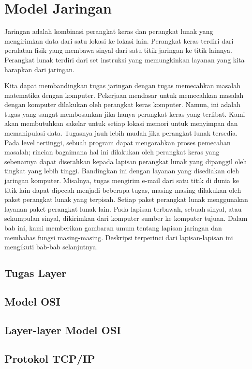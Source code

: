 \chapter{Model Jaringan}
Jaringan adalah kombinasi perangkat keras dan perangkat lunak yang mengirimkan data dari satu lokasi ke lokasi lain. Perangkat keras terdiri dari peralatan fisik yang membawa sinyal dari satu titik jaringan ke titik lainnya. Perangkat lunak terdiri dari set instruksi yang memungkinkan layanan yang kita harapkan dari jaringan. 

Kita dapat membandingkan tugas jaringan dengan tugas memecahkan masalah matematika dengan komputer. Pekerjaan mendasar untuk memecahkan masalah dengan komputer dilakukan oleh perangkat keras komputer. Namun, ini adalah tugas yang sangat membosankan jika hanya perangkat keras yang terlibat. Kami akan membutuhkan sakelar untuk setiap lokasi memori untuk menyimpan dan memanipulasi data. Tugasnya jauh lebih mudah jika perangkat lunak tersedia. Pada level tertinggi, sebuah program dapat mengarahkan proses pemecahan masalah; rincian bagaimana hal ini dilakukan oleh perangkat keras yang sebenarnya dapat diserahkan kepada lapisan perangkat lunak yang dipanggil oleh tingkat yang lebih tinggi. Bandingkan ini dengan layanan yang disediakan oleh jaringan komputer. Misalnya, tugas mengirim e-mail dari satu titik di dunia ke titik lain dapat dipecah menjadi beberapa tugas, masing-masing dilakukan oleh paket perangkat lunak yang terpisah. Setiap paket perangkat lunak menggunakan layanan paket perangkat lunak lain. Pada lapisan terbawah, sebuah sinyal, atau sekumpulan sinyal, dikirimkan dari komputer sumber ke komputer tujuan. Dalam bab ini, kami memberikan gambaran umum tentang lapisan jaringan dan membahas fungsi masing-masing. Deskripsi terperinci dari lapisan-lapisan ini mengikuti bab-bab selanjutnya.

\section{Tugas Layer}

\section{Model OSI}

\section{Layer-layer Model OSI}

\section{Protokol TCP/IP}

